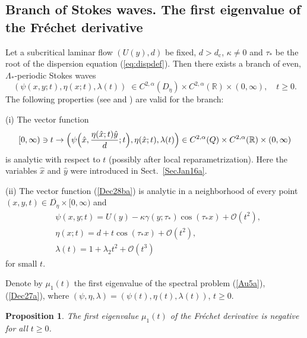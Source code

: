 \documentclass[oneside,a4paper,11pt]{article}
\newtheorem{proposition}[theorem]{Proposition}
\theoremstyle{thmstyletwo}%
\theoremstyle{thmstylethree}%
\numberwithin{equation}{section}
\def\gamm{\gamma}
\def\dcrit{d_{\textrm{c}}}
\def\taust{\tau_{*}}
\def\dUd{\kappa}
\def\Obig{\mathcal{O}}
\begin{document}
\subsection{Branch of Stokes waves. The first eigenvalue of the Fr\'{e}chet derivative}\label{SecJan16b}

Let a subcritical laminar flow $(U(y),d)$  be fixed, $d>\dcrit$, $\dUd\neq 0$ and  $\taust$ be the root of the dispersion equation (\ref{eq:dispdef}). Then there exists a branch of even, $\Lambda_*$-periodic Stokes waves
\begin{equation}\label{Dec28ba}
(\psi(x,y;t),\eta(x;t),\lambda(t))\;\in C^{2,\alpha}(D_\eta)\times C^{2,\alpha}(\mathbb{R})\times (0,\infty),\quad t\geq 0.
\end{equation}
 The following properties (see \cite{Var23} and \cite{Koz2}) are valid for the branch:

(i) The vector function
$$
[0,\infty) \ni t\rightarrow \Bigl(\psi\Bigl(\hat{x},\frac{\eta(\hat{x};t)\hat{y}}{d};t\Bigr),\eta(\hat{x};t),\lambda(t)\Bigr)\in C^{2,\alpha}(Q)\times C^{2,\alpha}(\mathbb{R})\times (0,\infty)
$$
is analytic with respect to $t$ (possibly after local reparametrization). Here the variables $\hat{x}$ and $\hat{y}$ were introduced in Sect.~\ref{SecJan16a}.

(ii) The vector function (\ref{Dec28ba}) is analytic in a neighborhood of every point $(x,y,t)\in \overline{D_\eta}\times [0,\infty)$
and
\begin{align*}
&\psi(x,y;t)=U(y)-\dUd \gamm(y;\taust)\cos(\taust x)+\Obig(t^2),\\
&\eta(x;t)=d+t\cos(\taust x)+\Obig(t^2),\\
&\lambda(t)=1+\lambda_2t^2+\Obig(t^3)
\end{align*}
for small $t$.

Denote by $\mu_1(t)$ the first eigenvalue of the spectral problem (\ref{Au5a}), (\ref{Dec27a}), where $(\psi,\eta,\lambda)=(\psi(t),\eta(t),\lambda(t))$, $t\geq 0$.

\begin{proposition}
The first eigenvalue $\mu_1(t)$ of the Fr\'{e}chet derivative is negative for all\/ $t\geq 0$.
\end{proposition}
\end{document}
